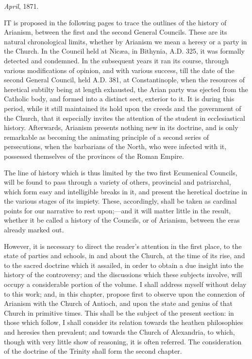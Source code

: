 \emph{April}, 1871.



IT is proposed in the following pages to
trace the outlines of the history of Arianism, between the first and
the second General Councils. These are its natural chronological
limits, whether by Arianism we mean a heresy or a party in the Church.
In the Council held at Nicæa, in Bithynia, A.D.
325, it was formally detected and condemned. In the subsequent years
it ran its course, through various modifications of opinion, and with
various success, till the date of the second General Council, held A.D.
381, at Constantinople, when the resources of heretical subtilty being
at length exhausted, the Arian party was ejected from the Catholic
body, and formed into a distinct sect, exterior to it. It is during
this period, while it still maintained its hold upon the creeds and
the government of the Church, that it especially invites the
attention of the student in ecclesiastical history. Afterwards,
Arianism presents nothing new in its doctrine, and is only remarkable
as becoming the animating principle of a second series of
persecutions, when the barbarians of the North, who were infected with
it, possessed themselves of the provinces of the Roman Empire.

The line of history which is thus limited by the two first
Ecumenical Councils, will be found to pass through a variety of
others, provincial and patriarchal, which form easy and intelligible
breaks in it, and present the heretical doctrine in the various stages
of its impiety. These, accordingly, shall be taken as cardinal points
for our narrative to rest upon;—and it will matter little in the
result, whether it be called a history of the Councils, or of Arianism,
between the eras already marked out.

However, it is necessary to direct the reader's attention in the
first place, to the state of parties and schools, in and about the
Church, at the time of its rise, and to the sacred doctrine which it
assailed, in order to obtain a due insight into the history of the
controversy; and the discussions which these subjects involve, will
occupy a considerable portion of the volume. I shall address myself
without delay to this work; and, in this chapter, propose first to
observe upon the connexion of Arianism with the Church of Antioch, and
upon the state and genius of that Church in primitive times. This
shall be the subject of the present section: in those which follow, I
shall consider its relation towards the heathen philosophies and
heresies then prevalent; and towards the Church of Alexandria, to
which, though with very little show of reasoning, it is often
referred. The consideration of the doctrine of the Trinity shall form
the second chapter.

